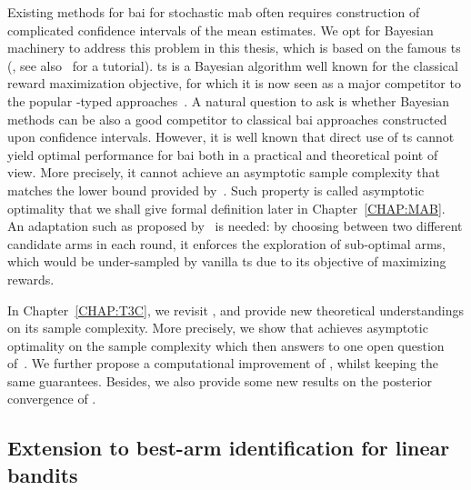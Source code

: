 Existing methods for \gls{bai} for stochastic \gls{mab} often requires construction of complicated confidence intervals of the mean estimates. We opt for Bayesian machinery to address this problem in this thesis, which is based on the famous \gls{ts} (\citealt{thompson1933}, see also~\citealt{russo2018} for a tutorial). \gls{ts} is a Bayesian algorithm well known for the classical reward maximization objective, for which it is now seen as a major competitor to the popular \UCB{}-typed approaches~\citep{auer2002ucb}. A natural question to ask is whether Bayesian methods can be also a good competitor to classical \gls{bai} approaches constructed upon confidence intervals. However, it is well known that direct use of \gls{ts} cannot yield optimal performance for \gls{bai} both in a practical and theoretical point of view. More precisely, it cannot achieve an asymptotic \gls{sample complexity} that matches the lower bound provided by~\cite{garivier2016tracknstop}. Such property is called \gls{asymptotic optimality} that we shall give formal definition later in Chapter~\ref{CHAP:MAB}. An adaptation such as \TTTS{} proposed by~\cite{russo2016ttts} is needed: by choosing between two different candidate arms in each round, it enforces the exploration of sub-optimal arms, which would be under-sampled by vanilla \gls{ts} due to its objective of maximizing rewards. 

In Chapter~\ref{CHAP:T3C}, we revisit \TTTS{}, and provide new theoretical understandings on its sample complexity. More precisely, we show that \TTTS{} achieves asymptotic optimality on the sample complexity which then answers to one open question of~\cite{russo2016ttts}. We further propose a computational improvement \TCC{} of \TTTS{}, whilst keeping the same guarantees. Besides, we also provide some new results on the posterior convergence of \TTTS{}.

\subsection{Extension to best-arm identification for linear bandits}\label{sec:intro.mab.linear}

